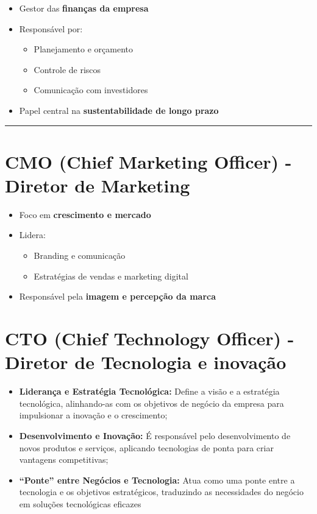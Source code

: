 \documentclass[
]{book}
\providecommand{\tightlist}{%
  \setlength{\itemsep}{0pt}\setlength{\parskip}{0pt}}
\begin{document}
\begin{itemize}
\tightlist
\item
  Gestor das \textbf{finanças da empresa}
\item
  Responsável por:

  \begin{itemize}
  \tightlist
  \item
    Planejamento e orçamento
  \item
    Controle de riscos
  \item
    Comunicação com investidores
  \end{itemize}
\item
  Papel central na \textbf{sustentabilidade de longo prazo}
\end{itemize}

\begin{center}\rule{0.5\linewidth}{0.5pt}\end{center}

\section{CMO (Chief Marketing Officer) - Diretor de Marketing}\label{cmo-chief-marketing-officer---diretor-de-marketing}

\begin{itemize}
\tightlist
\item
  Foco em \textbf{crescimento e mercado}
\item
  Lidera:

  \begin{itemize}
  \tightlist
  \item
    Branding e comunicação
  \item
    Estratégias de vendas e marketing digital
  \end{itemize}
\item
  Responsável pela \textbf{imagem e percepção da marca}
\end{itemize}

\section{\texorpdfstring{\textbf{CTO} (Chief Technology Officer) - Diretor de Tecnologia e inovação}{CTO (Chief Technology Officer) - Diretor de Tecnologia e inovação}}\label{cto-chief-technology-officer---diretor-de-tecnologia-e-inovauxe7uxe3o}

\begin{itemize}
\tightlist
\item
  \textbf{Liderança e Estratégia Tecnológica:} Define a visão e a estratégia tecnológica, alinhando-as com os objetivos de negócio da empresa para impulsionar a inovação e o crescimento;
\item
  \textbf{Desenvolvimento e Inovação:} É responsável pelo desenvolvimento de novos produtos e serviços, aplicando tecnologias de ponta para criar vantagens competitivas;
\item
  \textbf{``Ponte'' entre Negócios e Tecnologia:} Atua como uma ponte entre a tecnologia e os objetivos estratégicos, traduzindo as necessidades do negócio em soluções tecnológicas eficazes
\end{itemize}
\end{document}
